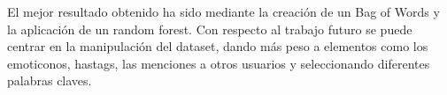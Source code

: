 \documentclass[11pt,a4paper]{article}
\begin{document}
El mejor resultado obtenido ha sido mediante la creación de un Bag of Words y la aplicación de un random forest. Con respecto al trabajo futuro se puede centrar en la manipulación del dataset, dando más peso a elementos como los emoticonos, hastags, las menciones a otros usuarios y seleccionando diferentes palabras claves.






\end{document}
